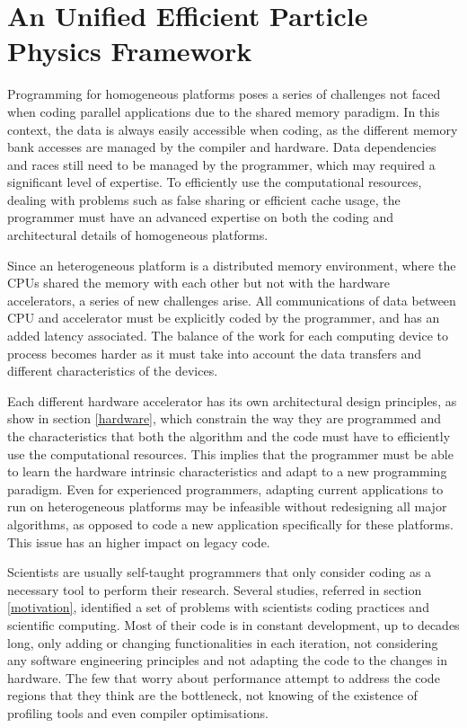 \chapter{An Unified Efficient Particle Physics Framework}
\label{new_lipmini}

Programming for homogeneous platforms poses a series of challenges not faced when coding parallel applications due to the shared memory paradigm. In this context, the data is always easily accessible when coding, as the different memory bank accesses are managed by the compiler and hardware. Data dependencies and races still need to be managed by the programmer, which may required a significant level of expertise. To efficiently use the computational resources, dealing with problems such as false sharing or efficient cache usage, the programmer must have an advanced expertise on both the coding and architectural details of homogeneous platforms.

Since an heterogeneous platform is a distributed memory environment, where the CPUs shared the memory with each other but not with the hardware accelerators, a series of new challenges arise. All communications of data between CPU and accelerator must be explicitly coded by the programmer, and has an added latency associated. The balance of the work for each computing device to process becomes harder as it must take into account the data transfers and different characteristics of the devices.

Each different hardware accelerator has its own architectural design principles, as show in section \ref{hardware}, which constrain the way they are programmed and the characteristics that both the algorithm and the code must have to efficiently use the computational resources. This implies that the programmer must be able to learn the hardware intrinsic characteristics and adapt to a new programming paradigm. Even for experienced programmers, adapting current applications to run on heterogeneous platforms may be infeasible without redesigning all major algorithms, as opposed to code a new application specifically for these platforms. This issue has an higher impact on legacy code.

Scientists are usually self-taught programmers that only consider coding as a necessary tool to perform their research. Several studies, referred in section \ref{motivation}, identified a set of problems with scientists coding practices and scientific computing. Most of their code is in constant development, up to decades long, only adding or changing functionalities in each iteration, not considering any software engineering principles and not adapting the code to the changes in hardware. The few that worry about performance attempt to address the code regions that they think are the bottleneck, not knowing of the existence of profiling tools and even compiler optimisations.

